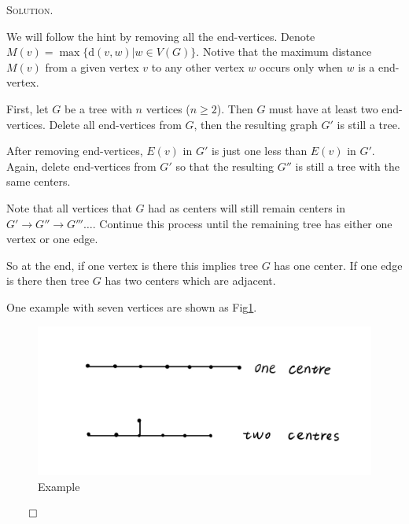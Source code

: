 \documentclass[12pt, a4paper, oneside]{ctexart}
\newenvironment{solution}{%
	\par\noindent\textsc{Solution. }\ignorespaces
}{%
	\hfill$\qed$\par
}
\begin{document}
	\begin{solution}
		
	We will follow the hint by removing all the end-vertices. Denote $M(v) = \max\{\text{d}(v,w)| w\in V(G)\}$.
    Notive that the maximum distance \( M(v) \) 
    from a given vertex \( v \) to any other vertex \( w \) occurs only 
    when \( w \) is a end-vertex.

    First, let \( G \) be a tree with \( n \) vertices (\( n \geq 2 \)).
    Then $G$ must have at least two end-vertices. Delete all end-vertices from \( G \), then the resulting graph \( G' \) is still a tree.

    After removing end-vertices, $E(v)$ in  $G'$ is just one less than $E(v)$ in  $G'$.
    Again, delete end-vertices from \( G' \) so that the resulting \( G'' \) is still a tree with the same centers.

    Note that all vertices that \( G \) had as centers will still remain centers 
    in \( G' \rightarrow G'' \rightarrow G''' \dots \).
    Continue this process until the remaining tree has either one vertex or one edge.

    So at the end, if one vertex is there this implies tree \( G \) has one center.
    If one edge is there then tree \( G \) has two centers which are adjacent.

    One example with seven vertices are shown as Fig\ref{fig:7V}.
    \begin{figure}[H]
		\small
		\centering
		\includegraphics[width=0.75\columnwidth]{figure/fig2.jpg}
		\caption{Example}
		\label{fig:7V}
	\end{figure}


		
	\end{solution}
	
\end{document}
